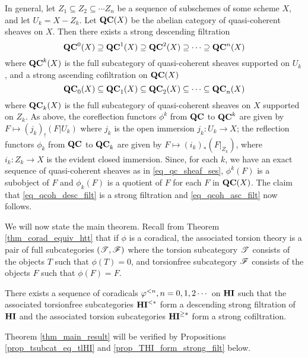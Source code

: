 \begin{ex}
In general, let $Z_1 \subseteq Z_2 \subseteq \cdots Z_n$ be
a sequence of subschemes of some scheme $X$, and let $U_k =
X - Z_k$. Let $\mathbf{QC}(X)$ be the abelian category of quasi-coherent 
sheaves on $X$. Then there exists a strong descending filtration 
\begin{equation}\label{eq_qcoh_desc_filt}
\mathbf{QC}^0(X) \supseteq \mathbf{QC}^1(X) \supseteq \mathbf{QC}^2(X) \supseteq 
   \cdots \supseteq \mathbf{QC}^n(X)
\end{equation}
where $\mathbf{QC}^k(X)$ is the full subcategory of quasi-coherent sheaves
supported on $U_k$, and a strong ascending cofiltration on 
$\mathbf{QC}(X)$
\begin{equation}\label{eq_qcoh_asc_filt}
\mathbf{QC}_0(X) \subseteq \mathbf{QC}_1(X) \subseteq \mathbf{QC}_2(X) \subseteq \cdots
\subseteq \mathbf{QC}_n(X)
\end{equation}
where $\mathbf{QC}_k(X)$ is the full subcategory of quasi-coherent 
sheaves on $X$ supported on $Z_k$. As above, the coreflection 
functors $\phi^k$ from $\mathbf{QC}$ to $\mathbf{QC}^k$ are given by $F 
\mapsto (j_k)_!(F|U_k)$ where $j_k$ is the open immersion $j_k: 
U_k \to X$; the reflection functors $\phi_k$ from $\mathbf{QC}$ to 
$\mathbf{QC}_k$ are given by $F \mapsto (i_k)_*(F|_{Z_k})$, where $i_k: 
Z_k \to X$ is the evident closed immersion. Since, for each 
$k$, we have an exact sequence of quasi-coherent sheaves as in
\eqref{eq_qc_sheaf_ses}, $\phi^k(F)$ is a subobject of $F$ and
$\phi_k(F)$ is a quotient of $F$ for each $F$ in $\mathbf{QC}(X)$.
The claim that \eqref{eq_qcoh_desc_filt} is a strong filtration
and \eqref{eq_qcoh_asc_filt} now follows.
\end{ex}

We will now state the main theorem. Recall from Theorem 
\ref{thm_corad_equiv_htt} that if $\phi$ is a coradical, the 
associated torsion theory is a pair of full subcategories
$(\mathscr{T}, \mathscr{F})$ where the torsion subcategory $\mathscr{T}$ 
consists of the objects $T$ such that $\phi(T) = 0$, and torsionfree
subcategory $\mathscr{F}$ consists of the objects $F$ such that 
$\phi(F) = F$.

\begin{thm}\label{thm_main_result}
There exists a sequence of coradicals $\varphi^{< n}, n = 0, 1, 2 
\cdots$ on $\mathbf{HI}$ such that the associated torsionfree 
subcategories $\mathbf{HI}^{< *}$ form a descending strong filtration
of $\mathbf{HI}$ and the associated torsion subcategories $\mathbf{HI}^{\geq *}$ 
form a strong cofiltration.
\end{thm}

Theorem \ref{thm_main_result} will be verified by Propositions
\ref{prop_tsubcat_eq_tlHI} and \ref{prop_THI_form_strong_filt} 
below.

